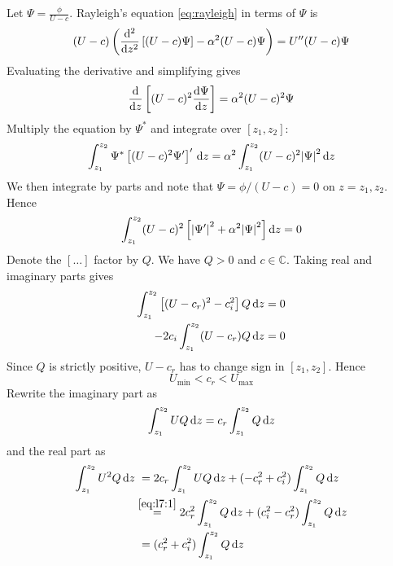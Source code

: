 \documentclass{jknotes}
\newcommand{\zint}{\int_{z_1}^{z_2}}
\begin{document}
Let $\Psi = \frac{\phi}{U-c}$. Rayleigh's equation \eqref{eq:rayleigh} in
terms of $\Psi$ is
\begin{equation}
	(U-c)\left( \frac{\diffd^2}{\diffd z^2}\left[ (U-c)\Psi\right] - \alpha^2
	(U-c)\Psi\right) = U''(U-c)\Psi
\end{equation}
Evaluating the derivative and simplifying gives
\begin{equation}
	\frac{\diffd}{\diffd z}\left[ (U-c)^2 \frac{\diffd \Psi}{\diffd z}\right]
	= \alpha^2 (U-c)^2\Psi
\end{equation}
Multiply the equation by $\Psi^*$ and integrate over $\left[z_1,z_2\right]$:
\begin{equation}
	\int_{z_1}^{z_2} \Psi^*\left[(U-c)^2\Psi'\right]' \, \diffd z = \alpha^2
	\zint (U-c)^2 \abs{\Psi}^2 \, \diffd z
\end{equation}
We then integrate by parts and note that $\Psi = \phi/(U-c) = 0$ on $z=z_1,
z_2$. Hence
\begin{equation}
	\zint (U-c)^2 \left[ \abs{\Psi'}^2 + \alpha^2 \abs{\Psi}^2\right] \diffd z
	= 0
\end{equation}
Denote the $\left[\dots\right]$ factor by $Q$. We have $Q > 0$ and $c \in
\mathbb{C}$. Taking real and imaginary parts gives
\begin{align}
	\zint\left[ (U-c_r)^2 - c_i^2\right]Q \, \diffd z &= 0\\
	-2c_i\zint (U-c_r)Q \, \diffd z &= 0
\end{align}
Since $Q$ is strictly positive, $U-c_r$ has to change sign in
$\left[z_1,z_2\right]$. Hence 
\begin{equation}
	U_{\min} < c_r < U_{\max}
\end{equation}
Rewrite the imaginary part as
\begin{equation}
	\zint U Q \, \diffd z  = c_r \zint Q \, \diffd z
	\label{eq:l7:1}
\end{equation}
and the real part as
\begin{align}
	\zint U^2 Q \, \diffd z &\hspace{.3em}= 2 c_r \zint UQ \, \diffd z + (-c_r^2 + c_i^2)
	\zint Q \, \diffd z \\
							&\stackrel{\eqref{eq:l7:1}}{=} 2c_r^2 \zint Q \,
							\diffd z + (c_i^2 - c_r^2) \zint Q \, \diffd z \\
							&\hspace{.3em}= (c_r^2 + c_i^2) \zint Q \, \diffd
							z \label{eq:l7:2}
\end{align}
\end{document}
